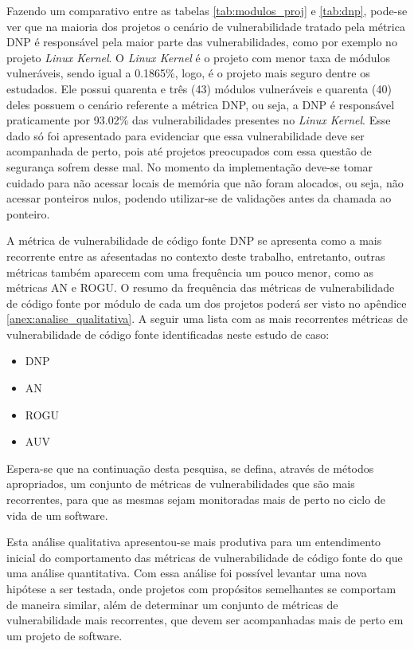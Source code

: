 Fazendo um comparativo entre as tabelas \ref{tab:modulos_proj} e \ref{tab:dnp}, pode-se ver que na
maioria dos projetos o cenário de vulnerabilidade tratado pela métrica DNP é responsável pela maior
parte das vulnerabilidades, como por exemplo no projeto \emph{Linux Kernel}. O \emph{Linux Kernel}
é o projeto com menor taxa de módulos vulneráveis, sendo igual a 0.1865\%, logo, é o projeto mais 
seguro dentre os estudados. Ele possui quarenta e três (43) módulos vulneráveis e quarenta (40) deles
possuem o cenário referente a métrica DNP, ou seja, a DNP é responsável praticamente por 93.02\% das 
vulnerabilidades presentes no \emph{Linux Kernel}. Esse dado só foi apresentado para evidenciar que
essa vulnerabilidade deve ser acompanhada de perto, pois até projetos preocupados com essa questão
de segurança sofrem desse mal. No momento da implementação deve-se tomar cuidado para não acessar 
locais de memória que não foram alocados, ou seja, não acessar ponteiros nulos,
podendo utilizar-se de validações antes da chamada ao ponteiro.

A métrica de vulnerabilidade de código fonte DNP se apresenta como a mais
recorrente entre as aŕesentadas
no contexto deste trabalho, entretanto, outras métricas também aparecem com uma frequência um pouco menor,
como as métricas AN e ROGU. O resumo da frequência das métricas de vulnerabilidade de código fonte por módulo
de cada um dos projetos poderá ser visto no apêndice \ref{anex:analise_qualitativa}. A seguir uma lista com
as mais recorrentes métricas de vulnerabilidade de código fonte identificadas
neste estudo de caso:

\begin{multicols}{2}
\begin{itemize}
  \item DNP
  \item AN
  \item ROGU
  \item AUV
\end{itemize}
\end{multicols}

Espera-se que na continuação desta pesquisa, se defina, através de métodos
apropriados, um conjunto de métricas de vulnerabilidades que são mais 
recorrentes, para que as mesmas sejam monitoradas mais de perto no ciclo de vida
de um software.

Esta análise qualitativa apresentou-se mais produtiva para um entendimento inicial do comportamento
das métricas de vulnerabilidade de código fonte do que uma análise quantitativa. Com essa análise foi
possível levantar uma nova hipótese a ser testada, onde projetos com propósitos
semelhantes se comportam de 
maneira similar, além de determinar um conjunto de métricas de vulnerabilidade mais recorrentes, que devem
ser acompanhadas mais de perto em um projeto de software.

